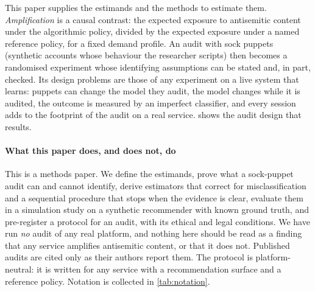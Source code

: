 This paper supplies the estimands and the methods to estimate them.
\emph{Amplification} is a causal contrast: the expected exposure to
antisemitic content under the algorithmic policy, divided by the expected
exposure under a named reference policy, for a fixed demand profile. An audit
with sock puppets (synthetic accounts whose behaviour the researcher scripts)
then becomes a randomised experiment whose identifying assumptions can be
stated and, in part, checked. Its design problems are those of any experiment
on a live system that learns: puppets can change the model they audit, the
model changes while it is audited, the outcome is measured by an imperfect
classifier, and every session adds to the footprint of the audit on a real
service.  shows the audit design that results.

%
\paragraph{What this paper does, and does not, do}
This is a methods paper. We define the estimands, prove what a sock-puppet
audit can and cannot identify, derive estimators that correct for
misclassification and a sequential procedure that stops when the evidence is
clear, evaluate them in a simulation study on a synthetic recommender with
known ground truth, and pre-register a protocol for an audit, with its ethical
and legal conditions. We have run \emph{no} audit of any real platform, and
nothing here should be read as a finding that any service amplifies
antisemitic content, or that it does not. Published audits are cited only as
their authors report them. The protocol is platform-neutral: it is written for
any service with a recommendation surface and a reference policy. Notation is
collected in \cref{tab:notation}.

%
